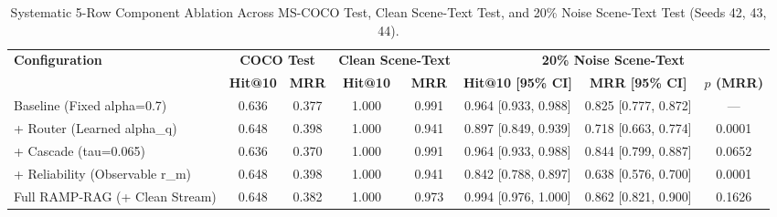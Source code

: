 \begin{table}[t]
\centering
\caption{Systematic 5-Row Component Ablation Across MS-COCO Test, Clean Scene-Text Test, and 20\% Noise Scene-Text Test (Seeds 42, 43, 44).}
\label{tab:systematic_ablation}
\small
\begin{tabular}{l c c c c c c c}
\hline
\textbf{Configuration} & \multicolumn{2}{c}{\textbf{COCO Test}} & \multicolumn{2}{c}{\textbf{Clean Scene-Text}} & \multicolumn{3}{c}{\textbf{20\% Noise Scene-Text}} \\
 & \textbf{Hit@10} & \textbf{MRR} & \textbf{Hit@10} & \textbf{MRR} & \textbf{Hit@10 [95\% CI]} & \textbf{MRR [95\% CI]} & \textbf{$p$ (MRR)} \\
\hline
Baseline (Fixed alpha=0.7) & 0.636 & 0.377 & 1.000 & 0.991 & 0.964 \scriptsize{[0.933, 0.988]} & 0.825 \scriptsize{[0.777, 0.872]} & --- \\
+ Router (Learned alpha_q) & 0.648 & 0.398 & 1.000 & 0.941 & 0.897 \scriptsize{[0.849, 0.939]} & 0.718 \scriptsize{[0.663, 0.774]} & 0.0001 \\
+ Cascade (tau=0.065) & 0.636 & 0.370 & 1.000 & 0.991 & 0.964 \scriptsize{[0.933, 0.988]} & 0.844 \scriptsize{[0.799, 0.887]} & 0.0652 \\
+ Reliability (Observable r_m) & 0.648 & 0.398 & 1.000 & 0.941 & 0.842 \scriptsize{[0.788, 0.897]} & 0.638 \scriptsize{[0.576, 0.700]} & 0.0001 \\
Full RAMP-RAG (+ Clean Stream) & 0.648 & 0.382 & 1.000 & 0.973 & 0.994 \scriptsize{[0.976, 1.000]} & 0.862 \scriptsize{[0.821, 0.900]} & 0.1626 \\
\hline
\end{tabular}
\end{table}
